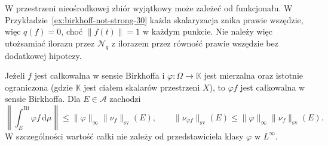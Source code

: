 W przestrzeni nieośrodkowej zbiór wyjątkowy może
zależeć od funkcjonału. W Przykładzie~\ref{ex:birkhoff-not-strong-30}
każda skalaryzacja znika prawie wszędzie, więc
$q(f)=0$, choć $\|f(t)\|=1$ w każdym punkcie.
Nie należy więc utożsamiać ilorazu przez $\mathcal N_q$
z ilorazem przez równość prawie wszędzie bez
dodatkowej hipotezy.

\begin{twierdzenie}
\label{thm:birkhoff-multipliers-30}
Jeżeli $f$ jest całkowalna w sensie Birkhoffa
i $\varphi:\Omega\to\mathbb K$ jest mierzalna
oraz istotnie ograniczona (gdzie $\mathbb K$ jest
ciałem skalarów przestrzeni $X$), to $\varphi f$ jest całkowalna
w sensie Birkhoffa. Dla $E\in\mathcal A$ zachodzi
\[
 \left\|\int_E^{\mathrm{Bi}}\varphi f\,\mathrm d\mu\right\|
 \le\|\varphi\|_\infty\|\nu_f\|_{\mathrm{sv}}(E),
 \qquad
 \|\nu_{\varphi f}\|_{\mathrm{sv}}(E)
 \le\|\varphi\|_\infty\|\nu_f\|_{\mathrm{sv}}(E).
\]
W szczególności wartość całki nie zależy od
przedstawiciela klasy $\varphi$ w $L^\infty$.
\end{twierdzenie}
